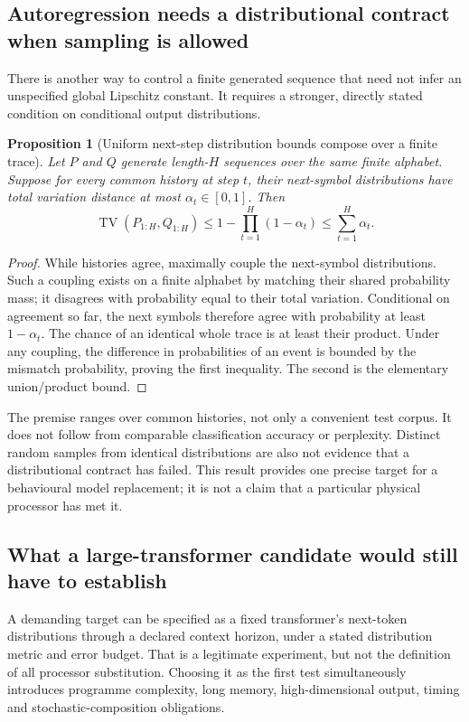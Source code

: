 \documentclass[11pt,a4paper]{article}
\newtheorem{proposition}[theorem]{Proposition}
\theoremstyle{definition}
\theoremstyle{remark}
\DeclareMathOperator{\TV}{TV}
\begin{document}
\subsection{Autoregression needs a distributional contract when sampling is allowed}
There is another way to control a finite generated sequence that need not infer an unspecified global Lipschitz constant. It requires a stronger, directly stated condition on conditional output distributions.
\begin{proposition}[Uniform next-step distribution bounds compose over a finite trace]\label{prop:tvtrace}
Let $P$ and $Q$ generate length-$H$ sequences over the same finite alphabet. Suppose for every common history at step $t$, their next-symbol distributions have total variation distance at most $\alpha_t\in[0,1]$. Then
\[
 \TV(P_{1:H},Q_{1:H})\leq1-\prod_{t=1}^{H}(1-\alpha_t)
 \leq\sum_{t=1}^{H}\alpha_t.
\]
\end{proposition}
\begin{proof}
While histories agree, maximally couple the next-symbol distributions. Such a coupling exists on a finite alphabet by matching their shared probability mass; it disagrees with probability equal to their total variation. Conditional on agreement so far, the next symbols therefore agree with probability at least $1-\alpha_t$. The chance of an identical whole trace is at least their product. Under any coupling, the difference in probabilities of an event is bounded by the mismatch probability, proving the first inequality. The second is the elementary union/product bound.
\end{proof}
The premise ranges over common histories, not only a convenient test corpus. It does not follow from comparable classification accuracy or perplexity. Distinct random samples from identical distributions are also not evidence that a distributional contract has failed. This result provides one precise target for a behavioural model replacement; it is not a claim that a particular physical processor has met it.

\subsection{What a large-transformer candidate would still have to establish}\label{subsec:largeaudit}
A demanding target can be specified as a fixed transformer's next-token distributions through a declared context horizon, under a stated distribution metric and error budget. That is a legitimate experiment, but not the definition of all processor substitution. Choosing it as the first test simultaneously introduces programme complexity, long memory, high-dimensional output, timing and stochastic-composition obligations.
\end{document}
